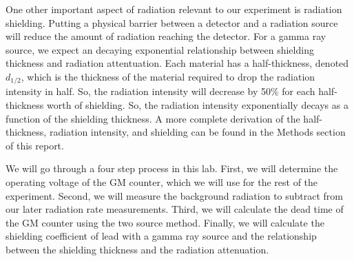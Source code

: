 \par One other important aspect of radiation relevant to our experiment is radiation shielding. Putting a physical barrier between a detector and a radiation source will reduce the amount of radiation reaching the detector. For a gamma ray source, we expect an decaying exponential relationship between shielding thickness and radiation attentuation. Each material has a half-thickness, denoted $d_{1/2}$, which is the thickness of the material required to drop the radiation intensity in half. So, the radiation intensity will decrease by 50\% for each half-thickness worth of shielding. So, the radiation intensity exponentially decays as a function of the shielding thickness. \cite{Spectrum}A more complete derivation of the half-thickness, radiation intensity, and shielding can be found in the Methods section of this report.

\par We will go through a four step process in this lab. First, we will determine the operating voltage of the GM counter, which we will use for the rest of the experiment. Second, we will measure the background radiation to subtract from our later radiation rate measurements. Third, we will calculate the dead time of the GM counter using the two source method. Finally, we will calculate the shielding coefficient of lead with a gamma ray source and the relationship between the shielding thickness and the radiation attenuation.

\begin{comment}
\par We expect the radiation attenuation to follow an exponential decay as a function of lead shielding thickness. The intensity (I) after passing through a lead shield of thickness X is given by the equation
\begin{equation}
I = I_0e^{-\mu X},
\end{equation}
where $I_0$ is the initial intensity and $\mu$ is the attenuation coefficient. To solve this equation for $\mu$, we set the final intensity equal to half the initial intensity, which will occur after a thickness $X_{1/2}$, the half thickness:
\begin{equation}
1/2 I = I_0e^{-\mu X_{1/2}}.
\end{equation}
Solving Equation (2) for $\mu$ gives
\begin{equation}
\mu = ln(2)/{X_{1/2}}.
\end{equation}
We will measure and calculate $\mu$ and $X_{1/2}$ for Cobalt-60 gamma radiation attenuation through lead, expecting an exponential relationship between the shielding thickness and the radiation attenuation\cite{Spectrum}. 
\end{comment}
